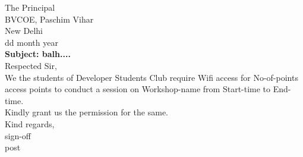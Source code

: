 \documentclass[12pt,a4paper]{article} %
\begin{document}
	

	\hspace{-8mm}
	The Principal \\
	BVCOE, Paschim Vihar\\
	New Delhi\\
	\linebreak
	dd month year\\
	\linebreak
	\textbf{Subject: balh....}\\
	\linebreak
	Respected Sir,\\
	
	\vspace{-5mm}
	\hspace{8mm}
	We the students of Developer Students Club require Wifi access for
	No-of-points
	access points to conduct a session on 
	Workshop-name 
	from 
	Start-time 
	to 
	End-time.\\
	Kindly grant us the permission for the same. \\
	\linebreak
	Kind regards,\\
	sign-off\\
	post 
	
\end{document}
